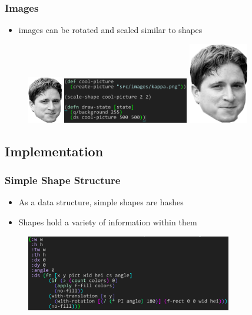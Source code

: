 \documentclass{beamer}
\begin{document}
\begin{frame}
\frametitle{Images}
	\begin{itemize}
		\item images can be rotated and scaled similar to shapes
	\end{itemize}
	\begin{figure}
		\vspace{-0.3cm}
		\includegraphics[width=1.5cm]{PresentationImages/kappa96x130.png}
		\hspace{0.4cm}
		\includegraphics[width=5.5cm]{PresentationImages/pictureCode.png}
		\hspace{0.4cm}
		\includegraphics[width=2.6cm]{PresentationImages/kappa96x130.png}
	\end{figure}

\end{frame}


\subsection{Implementation}

\begin{frame}
\frametitle{Simple Shape Structure}
	\begin{itemize}
		\item As a data structure, simple shapes are hashes
		\item Shapes hold a variety of information within them
	\end{itemize}
	\begin{figure}
		\includegraphics[width=9cm]{PresentationImages/rectHashmap.png}
	\end{figure}
\end{frame}
\end{document}
